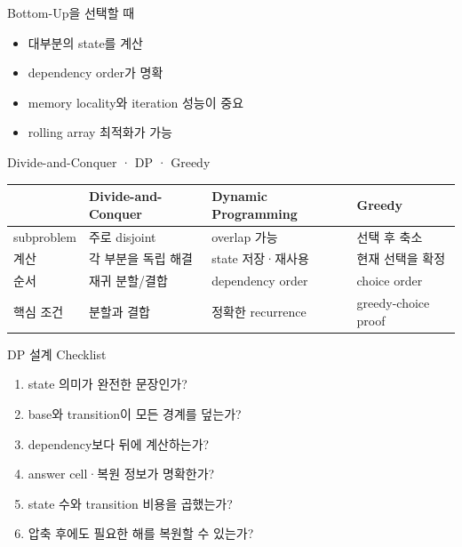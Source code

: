 \begin{frame}{Bottom-Up을 선택할 때}
\begin{itemize}\item 대부분의 state를 계산\item dependency order가 명확\item memory locality와 iteration 성능이 중요\item rolling array 최적화가 가능\end{itemize}
\end{frame}
\begin{frame}{Divide-and-Conquer · DP · Greedy}
\small\centering
\renewcommand{\arraystretch}{1.2}
\begin{tabular}{llll}\toprule
&Divide-and-Conquer&Dynamic Programming&Greedy\\\midrule
subproblem&주로 disjoint&overlap 가능&선택 후 축소\\
계산&각 부분을 독립 해결&state 저장·재사용&현재 선택을 확정\\
순서&재귀 분할/결합&dependency order&choice order\\
핵심 조건&분할과 결합&정확한 recurrence&greedy-choice proof\\\bottomrule
\end{tabular}
\vfill{}
\end{frame}
\begin{frame}{DP 설계 Checklist}
\small\begin{enumerate}\item state 의미가 완전한 문장인가?\item base와 transition이 모든 경계를 덮는가?\item dependency보다 뒤에 계산하는가?\item answer cell·복원 정보가 명확한가?\item state 수와 transition 비용을 곱했는가?\item 압축 후에도 필요한 해를 복원할 수 있는가?\end{enumerate}
\end{frame}
